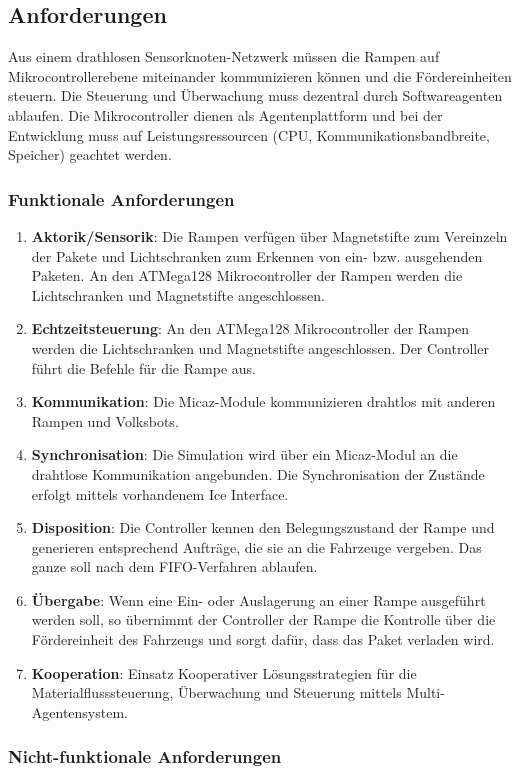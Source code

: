 \subsection{Anforderungen}
Aus einem drathlosen Sensorknoten-Netzwerk müssen die Rampen auf Mikrocontrollerebene miteinander kommunizieren können und die Fördereinheiten steuern.
Die Steuerung und Überwachung muss dezentral durch Softwareagenten ablaufen. Die Mikrocontroller dienen als Agentenplattform und bei der Entwicklung muss 
auf Leistungsressourcen (CPU, Kommunikationsbandbreite, Speicher) geachtet werden.
\subsubsection{Funktionale Anforderungen}
\begin{enumerate}
 \item \textbf{Aktorik/Sensorik}: Die Rampen verfügen über Magnetstifte zum Vereinzeln der Pakete und Lichtschranken zum Erkennen von ein- bzw. ausgehenden Paketen.
An den ATMega128 Mikrocontroller der Rampen werden die Lichtschranken und Magnetstifte angeschlossen.
 \item \textbf{Echtzeitsteuerung}: An den ATMega128 Mikrocontroller der Rampen werden die Lichtschranken und Magnetstifte angeschlossen.
Der Controller führt die Befehle für die Rampe aus. 
 \item \textbf{Kommunikation}: Die Micaz-Module kommunizieren drahtlos mit anderen Rampen und Volksbots.
 \item \textbf{Synchronisation}: Die Simulation wird über ein Micaz-Modul an die drahtlose Kommunikation angebunden.
Die Synchronisation der Zustände erfolgt mittels vorhandenem Ice Interface.
 \item \textbf{Disposition}: Die Controller kennen den Belegungszustand der Rampe und generieren entsprechend Aufträge, die sie an die Fahrzeuge vergeben. 
 Das ganze soll nach dem FIFO-Verfahren ablaufen.
 \item \textbf{Übergabe}: Wenn eine Ein- oder Auslagerung an einer Rampe ausgeführt werden soll, so übernimmt der Controller der Rampe die Kontrolle über die Fördereinheit des Fahrzeugs und sorgt dafür, dass das Paket verladen wird.
 \item \textbf{Kooperation}: Einsatz Kooperativer Lösungsstrategien für die Materialflusssteuerung, Überwachung und Steuerung mittels Multi-Agentensystem.
\end{enumerate}
\subsubsection{Nicht-funktionale Anforderungen}